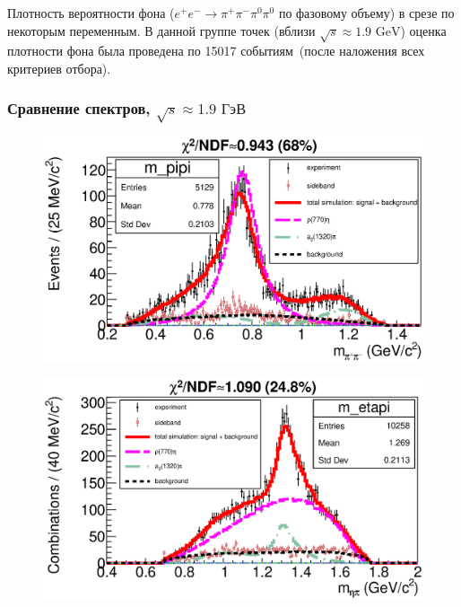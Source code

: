 \documentclass{beamer}
\begin{document}
\begin{frame}
\begin{center}
\begin{minipage}[t]{0.4\linewidth}
\begin{figure}
      \end{figure}
    \end{minipage}
  \end{center}
  \scriptsize
  Плотность вероятности фона ($e^+e^-\rightarrow\pi^+\pi^-\pi^0\pi^0$ по фазовому объему) в срезе по
  некоторым переменным. В данной группе точек (вблизи $\sqrt{s}\approx 1.9\text{ GeV}$)
  оценка плотности фона была проведена по 15017 событиям~(после наложения всех
  критериев отбора).
\end{frame}


\begin{frame}
  \frametitle{Сравнение спектров, $\sqrt{s}\approx{1.9}\text{ ГэВ}$}
  \begin{minipage}[t]{0.48\linewidth}
    \begin{figure}
      \includegraphics[width=\linewidth]{figures/m_pipi_g950.eps}
    \end{figure}
  \end{minipage}
  \begin{minipage}[t]{0.48\linewidth}
    \begin{figure}
      \includegraphics[width=\linewidth]{figures/m_etapi_g950.eps}

\end{figure}
\end{minipage}
\end{frame}
\end{document}
